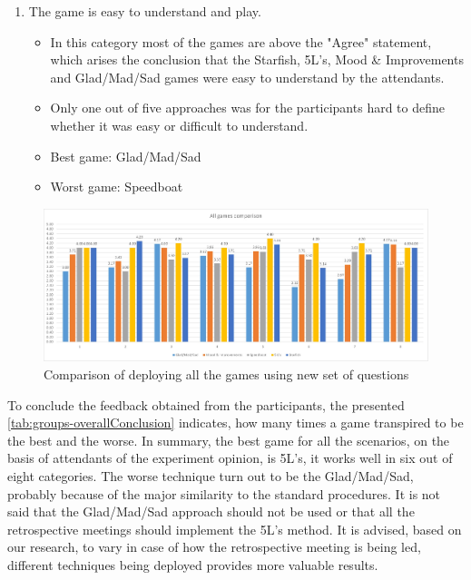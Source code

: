 \begin{enumerate}
    \item The game is easy to understand and play.
    \begin{itemize}
        \item In this category most of the games are above the "Agree" statement, which arises the conclusion that the Starfish, 5L's, Mood \& Improvements and Glad/Mad/Sad games were easy to understand by the attendants.
        \item Only one out of five approaches was for the participants hard to define whether it was easy or difficult to understand.
        \item Best game: Glad/Mad/Sad
        \item Worst game: Speedboat
    \end{itemize}
\end{enumerate}

\begin{figure}[!htbp]
\caption{Comparison of deploying all the games using new set of questions}
\label{fig:allGamesResultsNew}
\centering
\includegraphics[width=1.1\textwidth]{charts/allGamesComp}
\end{figure}

To conclude the feedback obtained from the participants, the presented \autoref{tab:groups-overallConclusion} indicates, how many times a game transpired to be the best and the worse. In summary, the best game for all the scenarios, on the basis of attendants of the experiment opinion, is 5L's, it works well in six out of eight categories. The worse technique turn out to be the Glad/Mad/Sad, probably because of the major similarity to the standard procedures. It is not said that the Glad/Mad/Sad approach should not be used or that all the retrospective meetings should implement the 5L's method. It is advised, based on our research, to vary in case of how the retrospective meeting is being led, different techniques being deployed provides more valuable results.

